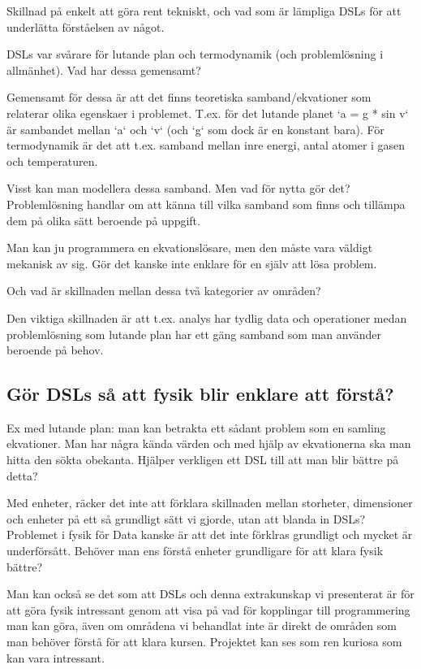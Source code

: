\begin{binge}
Skillnad på enkelt att göra rent tekniskt, och vad som är lämpliga DSLs för att
underlätta förståelsen av något.

\newpage

DSLs var svårare för lutande plan och termodynamik (och problemlösning i
allmänhet). Vad har dessa gemensamt?

Gemensamt för dessa är att det finns teoretiska samband/ekvationer som
relaterar olika egenskaer i problemet. T.ex. för det lutande planet `a = g *
sin v` är sambandet mellan `a` och `v` (och `g` som dock är en konstant bara).
För termodynamik är det att t.ex. samband mellan inre energi, antal atomer i
gasen och temperaturen.

Visst kan man modellera dessa samband. Men vad för nytta gör det?
Problemlösning handlar om att känna till vilka samband som finns och tillämpa
dem på olika sätt beroende på uppgift.

Man kan ju programmera en ekvationslösare, men den måste vara väldigt mekanisk
av sig. Gör det kanske inte enklare för en själv att lösa problem.

Och vad är skillnaden mellan dessa två kategorier av områden?

Den viktiga skillnaden är att t.ex. analys har tydlig data och operationer
medan problemlösning som lutande plan har ett gäng samband som man använder
beroende på behov.

\subsection{Gör DSLs så att fysik blir enklare att förstå?}

Ex med lutande plan: man kan betrakta ett sådant problem som en samling
ekvationer. Man har några kända värden och med hjälp av ekvationerna ska man
hitta den sökta obekanta. Hjälper verkligen ett DSL till att man blir bättre på
detta?

Med enheter, räcker det inte att förklara skillnaden mellan storheter,
dimensioner och enheter på ett så grundligt sätt vi gjorde, utan att blanda in
DSLs? Problemet i fysik för Data kanske är att det inte förklras grundligt och
mycket är underförsått. Behöver man ens förstå enheter grundligare för att
klara fysik bättre?

Man kan också se det som att DSLs och denna extrakunskap vi presenterat är för
att göra fysik intressant genom att visa på vad för kopplingar till
programmering man kan göra, även om områdena vi behandlat inte är direkt de
områden som man behöver förstå för att klara kursen. Projektet kan ses som ren
kuriosa som kan vara intressant.

\end{binge}
